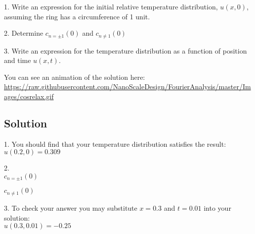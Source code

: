 1. Write an expression for the initial relative temperature distribution, $u(x,0)$, assuming the ring has a circumference of 1 unit.

2. Determine $c_{n=\pm 1}(0)$ and $c_{n \ne 1}(0)$

3. Write an expression for the temperature distribution as a function of position and time $u(x,t)$.

You can see an animation of the solution here:\\
\url{https://raw.githubusercontent.com/NanoScaleDesign/FourierAnalysis/master/Images/cosrelax.gif}

\subsection*{Solution}
1. You should find that your temperature distribution satisfies the result:\\
$u(0.2,0) = 0.309$

2.\\
$c_{n=\pm 1}(0)$\\

$c_{n \ne 1}(0)$\\

3. To check your answer you may substitute $x=0.3$ and $t=0.01$ into your solution:\\
$u(0.3,0.01) = -0.25$
